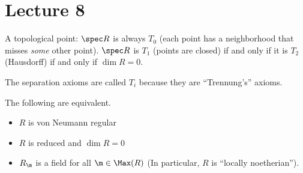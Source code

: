  \section{Lecture 8}

 A topological point: $\spec R$ is always $T_0$ (each point has a neighborhood that
 misses \emph{some} other point). $\spec R$ is $T_1$ (points are closed) if and only if
 it is $T_2$ (Hausdorff) if and only if $\dim R=0$.
 \begin{remark}
   The separation axioms are called $T_i$ because they are ``Trennung's'' axioms.
 \end{remark}
 \begin{corollary}
   The following are equivalent.
   \begin{itemize}
     \item $R$ is von Neumann regular
     \item $R$ is reduced and $\dim R=0$
     \item $R_\m$ is a field for all $\m\in \Max(R)$ (In particular, $R$ is
     ``locally noetherian'').
   \end{itemize}
 \end{corollary}

